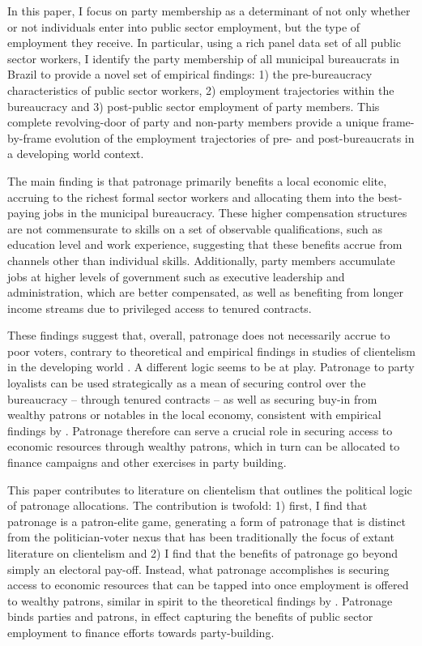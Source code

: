 \documentclass[12pt,a4paper]{article}
\begin{document}
In this paper, I focus on party membership as a determinant of not only whether or not individuals enter into public sector employment, but the type of employment they receive. In particular, using a rich panel data set of all public sector workers, I identify the party membership of all municipal bureaucrats in Brazil to provide a novel set of empirical findings: 1) the pre-bureaucracy characteristics of public sector workers, 2) employment trajectories within the bureaucracy and 3) post-public sector employment of party members. This complete revolving-door of party and non-party members provide a unique frame-by-frame evolution of the employment trajectories of pre- and post-bureaucrats in a developing world context.

The main finding is that patronage primarily benefits a local economic elite, accruing to the richest formal sector workers and allocating them into the best-paying jobs in the municipal bureaucracy. These higher compensation structures are not commensurate to skills on a set of observable qualifications, such as education level and work experience, suggesting that these benefits accrue from channels other than individual skills. Additionally, party members accumulate jobs at higher levels of government such as executive leadership and administration, which are better compensated, as well as benefiting from longer income streams due to privileged access to tenured contracts.

These findings suggest that, overall, patronage does not necessarily accrue to poor voters, contrary to theoretical and empirical findings in studies of clientelism in the developing world \citep{stokes2013brokers}. A different logic seems to be at play. Patronage to party loyalists can be used strategically as a mean of securing control over the bureaucracy -- through tenured contracts -- as well as securing buy-in from wealthy patrons or notables in the local economy, consistent with empirical findings by \citet{colonnelli2018patronage}. Patronage therefore can serve a crucial role in securing access to economic resources through wealthy patrons, which in turn can be allocated to finance campaigns and other exercises in party building.

This paper contributes to literature on clientelism that outlines the political logic of patronage allocations. The contribution is twofold: 1) first, I find that patronage is a patron-elite game, generating a form of patronage that is distinct from the politician-voter nexus that has been traditionally the focus of extant literature on clientelism \citet{stokes2013brokers, diaz2016political} and 2) I find that the benefits of patronage go beyond simply an electoral pay-off. Instead, what patronage accomplishes is securing access to economic resources that can be tapped into once employment is offered to wealthy patrons, similar in spirit to the theoretical findings by \citet{robinson2013political}. Patronage binds parties and patrons, in effect capturing the benefits of public sector employment to finance efforts towards party-building.
\end{document}
